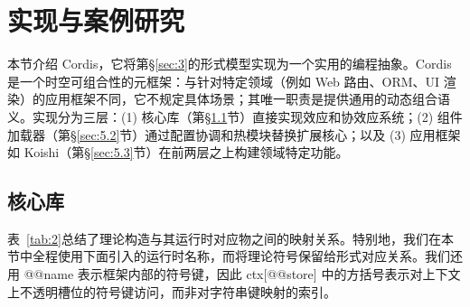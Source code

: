\section{实现与案例研究}\label{sec:5}

本节介绍 Cordis，它将第\S\ref{sec:3}的形式模型实现为一个实用的编程抽象。Cordis 是一个时空可组合性的元框架：与针对特定领域（例如 Web 路由、ORM、UI 渲染）的应用框架不同，它不规定具体场景；其唯一职责是提供通用的动态组合语义。实现分为三层：(1) 核心库（第\S\ref{sec:5.1}节）直接实现效应和协效应系统；(2) 组件加载器（第\S\ref{sec:5.2}节）通过配置协调和热模块替换扩展核心；以及 (3) 应用框架如 Koishi（第\S\ref{sec:5.3}节）在前两层之上构建领域特定功能。

\subsection{核心库}\label{sec:5.1}

表~\ref{tab:2}总结了理论构造与其运行时对应物之间的映射关系。特别地，我们在本节中全程使用下面引入的运行时名称，而将理论符号保留给形式对应关系。我们还用 @@name 表示框架内部的符号键，因此 ctx[@@store] 中的方括号表示对上下文上不透明槽位的符号键访问，而非对字符串键映射的索引。

